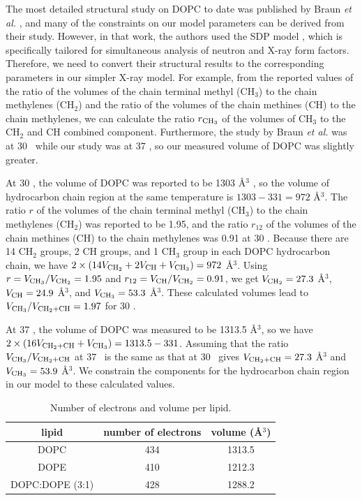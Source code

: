 The most detailed structural study on DOPC to date was published 
by Braun \textit{et al.} \cite{Braun13}, 
and many of the constraints on our model parameters can be derived
from their study. However, in that work, the authors used the 
SDP model \cite{Kucerka08}, which is specifically tailored for
simultaneous analysis of neutron and X-ray form factors. 
Therefore, we need to convert their structural results to the 
corresponding parameters in our simpler X-ray model. For example, 
from the reported values of the ratio of the volumes of the chain terminal
methyl (CH$_3$) to the chain methylenes (CH$_2$) and the ratio of 
the volumes of the chain methines (CH) to the chain methylenes, we can
calculate the ratio $r_{\textrm{CH}_3}$ of the volumes of CH$_3$ to the CH$_2$ and
CH combined component.  
Furthermore, the study by Braun \textit{et al.} was at 30 \textcelsius\
while our study was at 37 \textcelsius, so our
measured volume of DOPC was slightly greater.

At 30 \textcelsius, the volume of DOPC was reported to be 1303 \AA$^3$ \cite{Kucerka08}, 
so the volume of hydrocarbon chain region at the same temperature is 
$1303 - 331 = 972$ \AA$^3$. The ratio $r$ of the volumes
of the chain terminal methyl (CH$_3$) to the chain methylenes (CH$_2$) was 
reported to be 1.95, and the ratio $r_{12}$ of the volumes of the chain
methines (CH) to the chain methylenes was 0.91 at 30 \textcelsius. 
Because there are 14 CH$_2$ groups,
2 CH groups, and 1 CH$_3$ group in each DOPC hydrocarbon chain, we have
$2\times(14V_{\textrm{CH}_2}+2V_\textrm{CH}+V_{\textrm{CH}_3})=972$ \AA$^3$. 
Using $r=V_{\textrm{CH}_3}/V_{\textrm{CH}_2}=1.95$ 
and $r_{12}=V_\textrm{CH}/V_{\textrm{CH}_2}=0.91$, we get $V_{\textrm{CH}_2}=27.3$ \AA$^3$, 
$V_\textrm{CH}=24.9$ \AA$^3$, and $V_{\textrm{CH}_3}=53.3$ \AA$^3$. 
These calculated volumes lead to $V_{\textrm{CH}_3}/V_{\textrm{CH}_2+\textrm{CH}}=1.97$  for 30 \textcelsius. 

At 37 \textcelsius, the volume of DOPC was measured to be 1313.5 \AA$^3$, so
we have $2\times(16V_{\textrm{CH}_2+\textrm{CH}}+V_{\textrm{CH}_3})=1313.5-331$. Assuming that the ratio 
$V_{\textrm{CH}_3}/V_{\textrm{CH}_2+\textrm{CH}}$ at 37 \textcelsius\ is the same as that at 30 \textcelsius\ 
gives $V_{\textrm{CH}_2+\textrm{CH}}=27.3$ \AA$^3$ and $V_{\textrm{CH}_3}=53.9$ \AA$^3$. We constrain
the components for the hydrocarbon chain region in our model 
to these calculated values.

\begin{table}[htbp]
  \centering
  \begin{tabular}{ccc}
    \hline
    lipid & number of electrons & volume (\AA$^3$) \\
    \hline
    DOPC & 434 & 1313.5 \\
    DOPE & 410 & 1212.3 \\
    DOPC:DOPE (3:1) & 428 & 1288.2 \\
    \hline
  \end{tabular}
  \caption[Number of electrons and volume per lipid]
  {Number of electrons and volume per lipid.}
  \label{tab:electron_volume}
\end{table}

